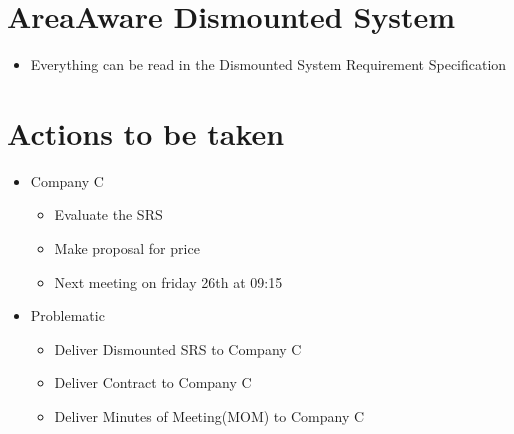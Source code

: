 \section*{AreaAware Dismounted System}
\begin{itemize}
	\item Everything can be read in the Dismounted System Requirement Specification
\end{itemize}

\section*{Actions to be taken}
\begin{itemize}
    \item Company C
    \begin{itemize}
    	\item Evaluate the SRS
    	\item Make proposal for price
    	\item Next meeting on friday 26th at 09:15
    \end{itemize}
    \item Problematic
    \begin{itemize}
    	\item Deliver Dismounted SRS to Company C
    	\item Deliver Contract to Company C
    	\item Deliver Minutes of Meeting(MOM) to Company C
    \end{itemize}
\end{itemize}
